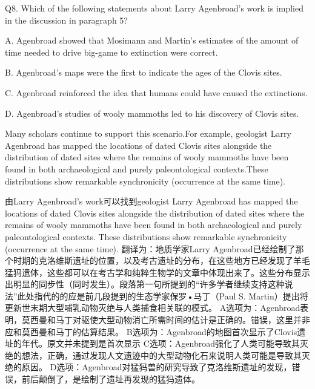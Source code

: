 \begin{blk}
    \begin{qst}
        Q8.
        Which of the following statements about Larry Agenbroad's work is implied in the discussion in paragraph 5?
    \end{qst}

    \begin{chc}
        A.
        Agenbroad showed that Mosimann and Martin's estimates of the amount of time needed to drive big-game to extinction were correct.

        B.
        Agenbroad's maps were the first to indicate the ages of the Clovis sites.

        C.
        Agenbroad reinforced the idea that humans could have caused the extinctions.

        D.
        Agenbroad's studies of wooly mammoths led to his discovery of Clovis sites.
    \end{chc}

    \begin{psgq}
        Many scholars continue to support this scenario.For example, geologist Larry Agenbroad has mapped the locations of dated Clovis sites alongside the distribution of dated sites where the remains of wooly mammoths have been found in both archaeological and purely paleontological contexts.These distributions show remarkable synchronicity (occurrence at the same time).
    \end{psgq}

    \begin{nlz}
        由Larry Agenbroad’s work可以找到geologist Larry Agenbroad has mapped the locations of dated Clovis sites alongside the distribution of dated sites where the remains of wooly mammoths have been found in both archaeological and purely paleontological contexts. These distributions show remarkable synchronicity (occurrence at the same time). 翻译为：地质学家Larry Agenbroad已经绘制了那个时期的克洛维斯遗址的位置，以及考古遗址的分布，在这些地方已经发现了羊毛猛犸遗体，这些都可以在考古学和纯粹生物学的文章中体现出来了。这些分布显示出明显的同步性（同时发生）。段落第一句所提到的“许多学者继续支持这种说法”此处指代的的应是前几段提到的生态学家保罗•马丁（Paul S. Martin）提出将更新世末期大型哺乳动物灭绝与人类捕食相关联的模式。 A选项为：Agenbroad表明，莫西曼和马丁对驱使大型动物消亡所需时间的估计是正确的。错误，这里并非应和莫西曼和马丁的估算结果。 B选项为：Agenbroad的地图首次显示了Clovis遗址的年代。原文并未提到是首次显示 C选项：Agenbroad强化了人类可能导致其灭绝的想法，正确，通过发现人文遗迹中的大型动物化石来说明人类可能是导致其灭绝的原因。 D选项：Agenbroad对猛犸兽的研究导致了克洛维斯遗址的发现，错误，前后颠倒了，是绘制了遗址再发现的猛犸遗体。
    \end{nlz}
\end{blk}

